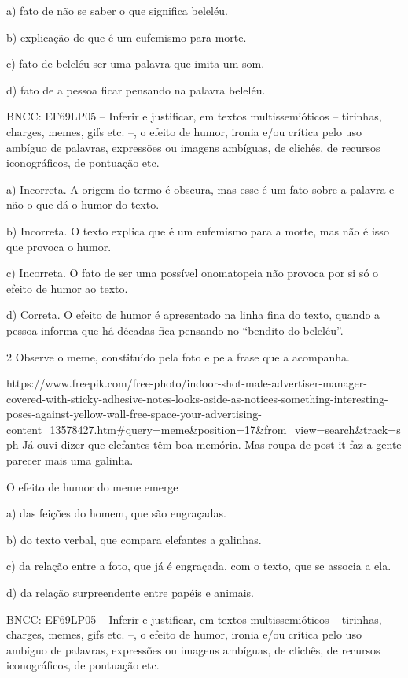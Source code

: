 a) fato de não se saber o que significa beleléu.

b) explicação de que é um eufemismo para morte.

c) fato de beleléu ser uma palavra que imita um som.

d) fato de a pessoa ficar pensando na palavra beleléu.

BNCC: EF69LP05 -- Inferir e justificar, em textos multissemióticos --
tirinhas, charges, memes, gifs etc. --, o efeito de humor, ironia e/ou
crítica pelo uso ambíguo de palavras, expressões ou imagens ambíguas, de
clichês, de recursos iconográficos, de pontuação etc.

a) Incorreta. A origem do termo é obscura, mas esse é um fato sobre a
palavra e não o que dá o humor do texto.

b) Incorreta. O texto explica que é um eufemismo para a morte, mas não é
isso que provoca o humor.

c) Incorreta. O fato de ser uma possível onomatopeia não provoca por si
só o efeito de humor ao texto.

d) Correta. O efeito de humor é apresentado na linha fina do texto,
quando a pessoa informa que há décadas fica pensando no ``bendito do
beleléu''.

\num{2} Observe o meme, constituído pela foto e pela frase que a
acompanha.

https://www.freepik.com/free-photo/indoor-shot-male-advertiser-manager-covered-with-sticky-adhesive-notes-looks-aside-as-notices-something-interesting-poses-against-yellow-wall-free-space-your-advertising-content\_13578427.htm\#query=meme\&position=17\&from\_view=search\&track=sph
Já ouvi dizer que elefantes têm boa memória. Mas roupa de post-it faz a
gente parecer mais uma galinha.

O efeito de humor do meme emerge

a) das feições do homem, que são engraçadas.

b) do texto verbal, que compara elefantes a galinhas.

c) da relação entre a foto, que já é engraçada, com o texto, que se
associa a ela.

d) da relação surpreendente entre papéis e animais.

BNCC: EF69LP05 -- Inferir e justificar, em textos multissemióticos --
tirinhas, charges, memes, gifs etc. --, o efeito de humor, ironia e/ou
crítica pelo uso ambíguo de palavras, expressões ou imagens ambíguas, de
clichês, de recursos iconográficos, de pontuação etc.

